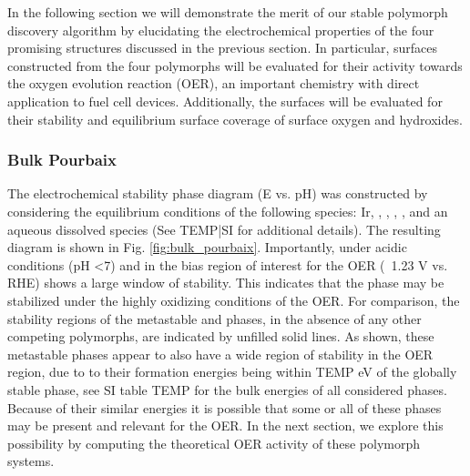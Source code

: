 

In the following section we will demonstrate the merit of our stable polymorph discovery algorithm by elucidating the electrochemical properties of the four promising structures discussed in the previous section.
%
In particular, surfaces constructed from the four polymorphs will be evaluated for their activity towards the oxygen evolution reaction (OER), an important chemistry with direct application to fuel cell devices.
%
Additionally, the surfaces will be evaluated for their stability and equilibrium surface coverage of surface oxygen and hydroxides.



\subsubsection{Bulk Pourbaix}

The electrochemical stability phase diagram (E vs. pH) was constructed by considering the equilibrium conditions of the following species: Ir, \rIrOtwo, \aIrOthree,  \rIrOthree, \bIrOthree, and an aqueous dissolved  species (See TEMP|SI for additional details).
%
The resulting diagram is shown in Fig. \ref{fig:bulk_pourbaix}.
%
Importantly, under acidic conditions (pH \textless 7) and in the bias region of interest for the OER (~1.23 V vs. RHE) \aIrOthree shows a large window of stability.
%
This indicates that the \aIrOthree phase may be stabilized under the highly oxidizing conditions of the OER.
%
For comparison, the stability regions of the metastable \rIrOthree and \bIrOthree phases, in the absence of any other competing  polymorphs, are indicated by unfilled solid lines.
%
As shown, these metastable phases appear to also have a wide region of stability in the OER region,
due to to their formation energies being within TEMP eV of the globally stable \aIrOthree phase, see SI table TEMP for the bulk energies of all considered phases.
%
Because of their similar energies it is possible that some or all of these  phases may be present and relevant for the OER.
%
In the next section, we explore this possibility by computing the theoretical OER activity of these polymorph systems.


